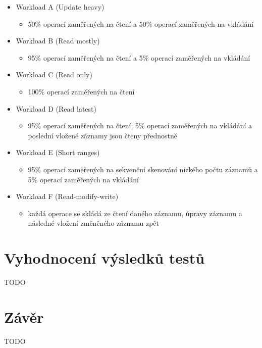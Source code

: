 \documentclass[czech,master,dept460,male,csharp,cpdeclaration]{diploma}
\begin{document}
	\begin{itemize}
		\item Workload A (Update heavy)
		\begin{itemize}
			\item 50\% operací zaměřených na čtení a 50\% operací zaměřených na vkládání
		\end{itemize}
		\item Workload B (Read mostly)
		\begin{itemize}
			\item 95\% operací zaměřených na čtení a 5\% operací zaměřených na vkládání
		\end{itemize}
		\item Workload C (Read only)
		\begin{itemize}
			\item 100\% operací zaměřených na čtení
		\end{itemize}
		\item Workload D (Read latest)
		\begin{itemize}
			\item 95\% operací zaměřených na čtení, 5\% operací zaměřených na vkládání a poslední vložené záznamy jsou čteny přednostně
		\end{itemize}
		\item Workload E (Short ranges)
		\begin{itemize}
			\item 95\% operací zaměřených na sekvenční skenování nízkého počtu záznamů a 5\% operací zaměřených na vkládání
		\end{itemize}
		\item Workload F (Read-modify-write)
		\begin{itemize}
			\item každá operace se skládá ze čtení daného záznamu, úpravy záznamu a následné vložení změněného záznamu zpět
		\end{itemize}
	\end{itemize}
	
	
	
	
	\chapter{Vyhodnocení výsledků testů}
	
	TODO
	
	\chapter{Závěr}
	
	TODO
		
	\nocite{*}
	
	\printbibliography[title={Literatura}, heading=bibintoc]
	
\end{document}
